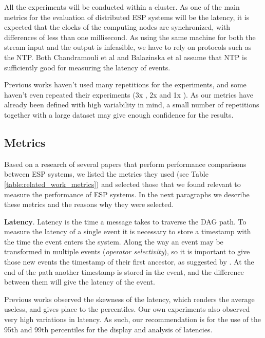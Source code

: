 \documentclass[ppgc,diss,english]{iiufrgs}
\begin{document}
All the experiments will be conducted within a cluster. As one of the main metrics for the evaluation of distributed ESP systems will be the latency, it is expected that the clocks of the computing nodes are synchronized, with differences of less than one millisecond. As using the same machine for both the stream input and the output is infeasible, we have to rely on protocols such as the NTP. Both Chandramouli et al \cite{chandramouli2011accurate} and Balazinska et al \cite{balazinska2008fault} assume that NTP is sufficiently good for measuring the latency of events.

Previous works haven't used many repetitions for the experiments, and some haven't even repeated their experiments (3x \cite{dayarathna2013performance}, 2x \cite{mendes2009performance} and 1x \cite{de2011watershed}). As our metrics have already been defined with high variability in mind, a small number of repetitions together with a large dataset may give enough confidence for the results.

\subsection{Metrics}

Based on a research of several papers that perform performance comparisons between ESP systems, we listed the metrics they used (see Table \ref{table:related_work_metrics}) and selected those that we found relevant to measure the performance of ESP systems. In the next paragraphs we describe these metrics and the reasons why they were selected.

\textbf{Latency}. Latency is the time a message takes to traverse the DAG path. To measure the latency of a single event it is necessary to store a timestamp with the time the event enters the system. Along the way an event may be transformed in multiple events (\emph{operator selectivity}), so it is important to give those new events the timestamp of their first ancestor, as suggested by \cite{chandramouli2011accurate}. At the end of the path another timestamp is stored in the event, and the difference between them will give the latency of the event.

Previous works \cite{dayarathna2011performance, akidau2013millwheel, castro2013integrating} observed the skewness of the latency, which renders the average useless, and gives place to the percentiles. Our own experiments also observed very high variations in latency. As such, our recommendation is for the use of the 95th and 99th percentiles for the display and analysis of latencies.
\end{document}
